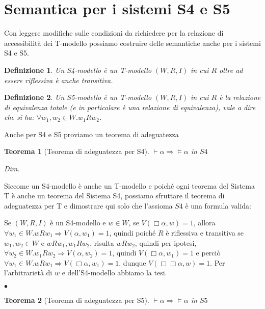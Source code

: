 \documentclass[a4paper, titlepage, 12pt]{report}
\newtheorem{theorem}{Teorema}[chapter]
\newtheorem{definition}{Definizione}[chapter]
\newenvironment{proof}
    {\textit{Dim.}
    }
    {\begin{flushright}$\bullet$\end{flushright}
    }
\begin{document}
\section{Semantica per i sistemi S4 e S5}
Con leggere modifiche sulle condizioni da richiedere
per la relazione di accessibilità dei T-modello possiamo costruire delle semantiche
anche per i sistemi S4 e S5.

\begin{definition}
Un S4-modello è un T-modello $(W, R, I)$ in cui $R$ oltre ad essere riflessiva è anche transitiva.
\end{definition}

\begin{definition}
Un S5-modello è un T-modello $(W, R, I)$ in cui $R$ è la relazione di equivalenza totale
(e in particolare è una relazione di equivalenza),
vale a dire che si ha: $\forall w_1, w_2 \in W. w_1 R w_2$.
\end{definition}

Anche per S4 e S5 proviamo un teorema di adeguatezza

\begin{theorem}[Teorema di adeguatezza per S4]
$\vdash \alpha \Rightarrow \vDash \alpha$ in $S4$
\end{theorem}

\begin{proof}
Siccome un S4-modello è anche un T-modello e poiché ogni teorema del Sistema T
è anche un teorema del Sistema S4, possiamo sfruttare il teorema di adeguatezza per T
e dimostrare qui solo che l'assioma $S4$ è una formula valida:

Se $(W, R, I)$ è un S4-modello e $w \in W$,
se $V(\Box \alpha, w) = 1$, allora $\forall w_1 \in W. wRw_1 \Rightarrow V(\alpha, w_1) = 1$,
quindi poiché $R$ è riflessiva e transitiva
se $w_1, w_2 \in W$ e $wRw_1, w_1Rw_2$, risulta $wRw_2$, quindi per ipotesi,
$\forall w_2 \in W. w_1Rw_2 \Rightarrow V(\alpha, w_2) = 1$, quindi $V(\Box \alpha, w_1) = 1$
e perciò $\forall w_1 \in W. wRw_1 \Rightarrow V(\Box \alpha, w_1) = 1$,
dunque $V(\Box \Box \alpha, w) = 1$.
Per l'arbitrarietà di $w$ e dell'S4-modello abbiamo la tesi.
\end{proof}


\begin{theorem}[Teorema di adeguatezza per S5]
$\vdash \alpha \Rightarrow \vDash \alpha$ in $S5$
\end{theorem}
\end{document}
